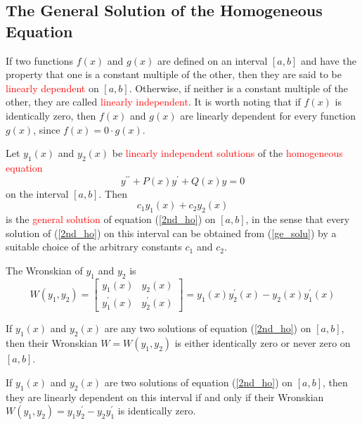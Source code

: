 \documentclass[11pt,a4paper]{article}
\begin{document}
\subsection{The General Solution of the Homogeneous Equation}
If two functions $f(x)$ and $g(x)$ are defined on an interval $[a, b]$ and have the property that one is a constant multiple of the other, then they are said to be \textcolor{red}{linearly dependent} on $[a, b]$. Otherwise, if neither is a constant multiple of the other, they are called \textcolor{red}{linearly independent}. It is worth noting that if $f(x)$ is identically zero, then $f(x)$ and $g(x)$ are linearly dependent for every function $g(x)$, since $f(x) = 0 \cdot g(x)$.

\begin{tcolorbox}[colback=green!15,colframe=green!40!black,title=Theorem A]
Let $y_1(x)$ and $y_2(x)$ be \textcolor{red}{linearly independent solutions} of the \textcolor{red}{homogeneous equation}
\begin{equation}
y^{\prime\prime} +P(x) y^\prime +Q(x) y = 0
\label{2nd_ho}
\end{equation}
on the interval $[a, b]$. Then
\begin{equation}
c_1 y_1(x) + c_2 y_2(x)
\label{ge_solu}
\end{equation}
is the \textcolor{red}{general solution} of equation (\ref{2nd_ho}) on $[a, b]$, in the sense that every solution of (\ref{2nd_ho}) on this interval can be obtained from (\ref{ge_solu}) by a suitable choice of the arbitrary  constants $c_1$ and $c_2$.
\end{tcolorbox}

The Wronskian of $y_1$ and $y_2$ is
\begin{equation}
W(y_1, y_2) = \left[ \begin{array}{cc}
y_1(x) & y_2(x) \\
y^\prime_1(x) & y^\prime_2(x)
\end{array} \right] = y_1(x) y^\prime_2(x) -y_2(x) y^\prime_1(x)
\end{equation}

\begin{tcolorbox}[colback=green!15,colframe=green!40!black,title=Lemma 1]
If $y_1(x)$ and $y_2(x)$ are any two solutions of equation (\ref{2nd_ho}) on $[a, b]$, then their Wronskian $W = W(y_1, y_2)$ is either identically zero or never zero on $[a, b]$.
\end{tcolorbox}



\begin{tcolorbox}[colback=green!15,colframe=green!40!black,title=Lemma 2]
If $y_1(x)$ and $y_2(x)$ are two solutions of equation (\ref{2nd_ho}) on $[a, b]$, then they are linearly dependent on this interval if and only if their Wronskian $W(y_1, y_2) = y_1y^\prime_2 -y_2y_1^\prime$ is identically zero.
\end{tcolorbox}
\end{document}
